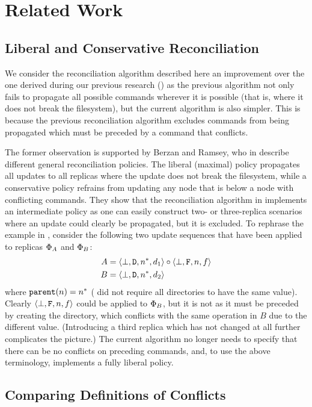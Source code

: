 
\section{Related Work}

\subsection{Liberal and Conservative Reconciliation}

We consider the reconciliation algorithm described here an improvement over
the one derived during our previous research (\cite{NREC})
as the previous algorithm not only fails to propagate all possible commands
wherever it is possible (that is, where it does not break the filesystem),
but the current algorithm is also simpler.
This is because the previous reconciliation algorithm excludes
commands from being propagated which must be preceded by a command that conflicts.

The former observation is supported by Berzan and Ramsey, who in \cite{CBNR} 
describe different general reconciliation policies.
The liberal (maximal) policy propagates all updates to all replicas where
the update does not break the filesystem, while a conservative policy
refrains from updating any node that is below a node with conflicting commands.
They show that the reconciliation algorithm in \cite{NREC} implements
an intermediate policy as one can easily construct two- or three-replica scenarios
where an update could clearly be propagated, but it is excluded.
To rephrase the example in \cite{CBNR}, consider the following two
update sequences that have been applied to replicas $\Phi_A$ and $\Phi_B$:
\begin{align*}
A&=\langle{\bot,\mathtt{D},n^*,d_1}\rangle\circ\langle{\bot,\mathtt{F},n,f}\rangle \\
B&=\langle{\bot,\mathtt{D},n^*,d_2}\rangle
\end{align*}
where $\mathtt{parent}(n)=n^*$ (\cite{NREC} did not require all directories to have the same value).
Clearly $\langle{\bot,\mathtt{F},n,f}\rangle$ could be applied to $\Phi_B$, but it is not as
it must be preceded by creating the directory, which conflicts with the same operation in $B$
due to the different value.
(Introducing a third replica which has not changed at all further complicates the picture.)
The current algorithm no longer needs to specify that there can be no conflicts
on preceding commands, and, to use the above terminology, implements a fully liberal policy.


\subsection{Comparing Definitions of Conflicts}

